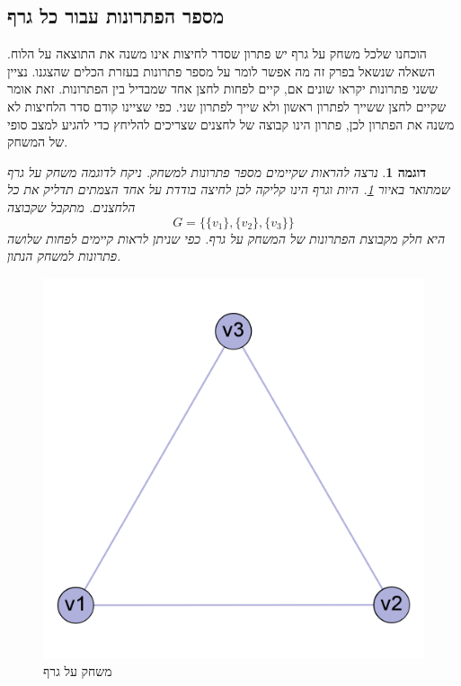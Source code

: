 \documentclass[12pt,leqno]{article}
\theoremstyle{theoremdd}
\newtheorem{example}{דוגמה}[section]
\begin{document}
\subsection{מספר הפתרונות עבור כל גרף}
הוכחנו שלכל משחק על גרף יש פתרון שסדר לחיצות
אינו משנה את התוצאה על הלוח.
השאלה  שנשאל בפרק זה מה אפשר לומר על מספר פתרונות בעזרת הכלים שהצגנו.
נציין ששני פתרונות יקראו שונים אם, קיים לפחות לחצן אחד שמבדיל בין הפתרונות.
זאת אומר שקיים לחצן ששייך לפתרון ראשון ולא שייך לפתרון שני.
כפי שציינו קודם סדר הלחיצות לא משנה את הפתרון לכן, פתרון הינו קבוצה של לחצנים
שצריכים להליחץ כדי להגיע למצב סופי של המשחק.
\begin{example}
    נרצה להראות שקיימים מספר פתרונות למשחק.
    ניקח לדוגמה משחק על גרף שמתואר באיור 
    \ref{fig: clic 3 node graph game}.
    היות וגרף הינו קליקה לכן לחיצה בודדת על אחד הצמתים תדליק את כל הלחצנים.
    מתקבל שקבוצה
    \[G = \{\{v_1\}, \{v_2\}, \{v_3\} \}\]
    היא חלק מקבוצת הפתרונות של המשחק על גרף.
    כפי שניתן לראות קיימים לפחות שלושה פתרונות למשחק הנתון.
\end{example}

\begin{figure}[ht]
    \caption{משחק על גרף}
    \label{fig: clic 3 node graph game} 
    \centering
    \includegraphics[width=.3\textwidth,keepaspectratio]{images/clic_graph_3_node.png}
\end{figure}
\end{document}
